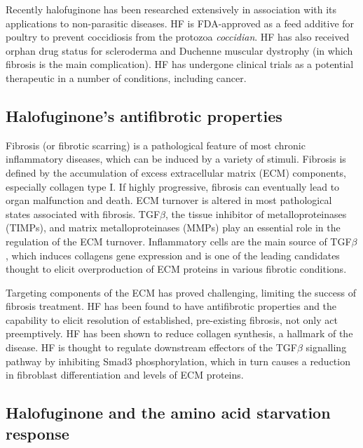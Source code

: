 Recently halofuginone has been researched extensively in association with its applications to non-parasitic diseases.
HF is FDA-approved as a feed additive for poultry to prevent coccidiosis from the protozoa \textit{coccidian}.
HF has also received orphan drug status for scleroderma and Duchenne muscular dystrophy (in which fibrosis is the main complication).
HF has undergone clinical trials as a potential therapeutic in a number of conditions, including cancer\cite{halo2012clin, halo2012clin2}.

\subsection{Halofuginone's antifibrotic properties}
Fibrosis (or fibrotic scarring) is a pathological feature of most chronic inflammatory diseases, which can be induced by a variety of stimuli\cite{wynn2012mechanisms}.
Fibrosis is defined by the accumulation of excess extracellular matrix (ECM) components, especially collagen type I.
If highly progressive, fibrosis can eventually lead to organ malfunction and death\cite{wynn2012mechanisms}.
ECM turnover is altered in most pathological states associated with fibrosis.
TGF$\beta$, the tissue inhibitor of metalloproteinases (TIMPs), and matrix metalloproteinases (MMPs) play an essential role in the regulation of the ECM turnover.
Inflammatory cells are the main source of TGF$\beta$, which induces collagens gene expression and is one of the leading candidates thought to elicit overproduction of ECM proteins in various fibrotic conditions.

Targeting components of the ECM has proved challenging, limiting the success of fibrosis treatment.
HF has been found to have antifibrotic properties and the capability to elicit resolution of established, pre-existing fibrosis, not only act preemptively\cite{pines1998halofuginone}.
HF has been shown to reduce collagen synthesis, a hallmark of the disease\cite{pines2001reduction}.
HF is thought to regulate downstream effectors of the TGF$\beta$ signalling pathway by inhibiting Smad3 phosphorylation, which in turn causes a reduction in fibroblast differentiation and levels of ECM proteins\cite{pines2015halofuginone}.

\subsection{Halofuginone and the amino acid starvation response}

